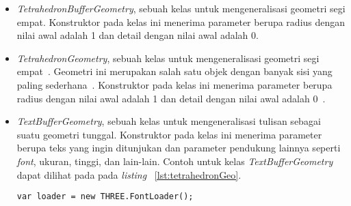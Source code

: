 \begin{itemize}
\begin{itemize}
		\item {\it TetrahedronBufferGeometry}, sebuah kelas untuk mengeneralisasi geometri segi empat. Konstruktor pada kelas ini menerima parameter berupa radius dengan nilai awal adalah 1 dan detail dengan nilai awal adalah 0.
		\item {\it TetrahedronGeometry}, sebuah kelas untuk mengeneralisasi geometri segi empat~\cite{threejs}. Geometri ini merupakan salah satu objek dengan banyak sisi yang paling sederhana~\cite{learningThreejs}. Konstruktor pada kelas ini menerima parameter berupa radius dengan nilai awal adalah 1 dan detail dengan nilai awal adalah 0~\cite{threejs}.
		\item {\it TextBufferGeometry}, sebuah kelas untuk mengeneralisasi tulisan sebagai suatu geometri tunggal. Konstruktor pada kelas ini menerima parameter berupa teks yang ingin ditunjukan dan parameter pendukung lainnya seperti {\it font}, ukuran, tinggi, dan lain-lain. Contoh untuk kelas {\it TextBufferGeometry} dapat dilihat pada pada {\it listing} ~\ref{lst:tetrahedronGeo}.
	
\begin{lstlisting}[caption={Contoh penggunaan kelas {\it TextBufferGeometry}.}, label={lst:tetrahedronGeo},captionpos=b]
var loader = new THREE.FontLoader();


\end{lstlisting}
\end{itemize}
\end{itemize}
